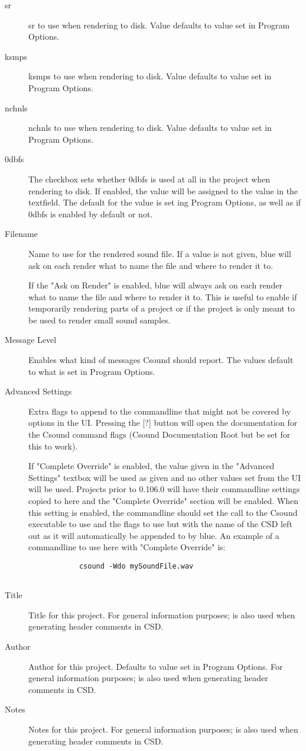 \begin{description}
\item[sr]
sr to use when rendering to disk. Value defaults to value set in Program
Options.
\item[ksmps]
ksmps to use when rendering to disk. Value defaults to value set in
Program Options.
\item[nchnls]
nchnls to use when rendering to disk. Value defaults to value set in
Program Options.
\item[0dbfs]
The checkbox sets whether 0dbfs is used at all in the project when
rendering to disk. If enabled, the value will be assigned to the value
in the textfield. The default for the value is set ing Program Options,
as well as if 0dbfs is enabled by default or not.
\item[Filename]
Name to use for the rendered sound file. If a value is not given, blue
will ask on each render what to name the file and where to render it to.

If the "Ask on Render" is enabled, blue will always ask on each render
what to name the file and where to render it to. This is useful to
enable if temporarily rendering parts of a project or if the project is
only meant to be used to render small sound samples.
\item[Message Level]
Enables what kind of messages Csound should report. The values default
to what is set in Program Options.
\item[Advanced Settings]
Extra flags to append to the commandline that might not be covered by
options in the UI. Pressing the {[}?{]} button will open the
documentation for the Csound command flags (Csound Documentation Root
but be set for this to work).

If "Complete Override" is enabled, the value given in the "Advanced
Settings" textbox will be used as given and no other values set from the
UI will be used. Projects prior to 0.106.0 will have their commandline
settings copied to here and the "Complete Override" section will be
enabled. When this setting is enabled, the commandline should set the
call to the Csound executable to use and the flags to use but with the
name of the CSD left out as it will automatically be appended to by
blue. An example of a commandline to use here with "Complete Override"
is:

\begin{verbatim}
            csound -Wdo mySoundFile.wav
          
\end{verbatim}
\end{description}

\begin{description}
\item[Title]
Title for this project. For general information purposes; is also used
when generating header comments in CSD.
\item[Author]
Author for this project. Defaults to value set in Program Options. For
general information purposes; is also used when generating header
comments in CSD.
\item[Notes]
Notes for this project. For general information purposes; is also used
when generating header comments in CSD.
\end{description}
